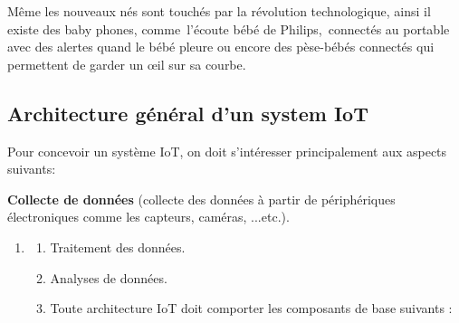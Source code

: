 \documentclass[12pt,a4paper]{report}
\begin{document}
\noindent \begin{flushleft}
	M\^{e}me les nouveaux n\'{e}s sont touch\'{e}s par la r\'{e}volution technologique, ainsi il existe des baby phones, comme~l'\'{e}coute b\'{e}b\'{e} de Philips,~connect\'{e}s au portable avec des alertes quand le b\'{e}b\'{e} pleure ou encore des p\`{e}se-b\'{e}b\'{e}s connect\'{e}s qui permettent de garder un {\oe}il sur sa courbe.
	
	\noindent 
	
	\noindent 
	
	\noindent 
	
	\noindent 
	
	\noindent 
	
	\noindent 
	
	\noindent 
	
	\noindent 
	
	\subsection{Architecture g\'{e}n\'{e}ral d'un system IoT}
	
	\noindent Pour concevoir un syst\`{e}me IoT, on doit s'int\'{e}resser principalement aux aspects suivants:
	
	\noindent \textbf{Collecte de donn\'{e}es }(collecte des donn\'{e}es \`{a} partir de p\'{e}riph\'{e}riques \'{e}lectroniques comme les capteurs, cam\'{e}ras, ...etc.).
\end{flushleft}

\begin{enumerate}
	\item \begin{enumerate}
		\item  Traitement des donn\'{e}es.
		
		\item  Analyses de donn\'{e}es.
		
		\item  Toute architecture IoT doit comporter les composants de base suivants :
	\end{enumerate}
\end{enumerate}
\end{document}
